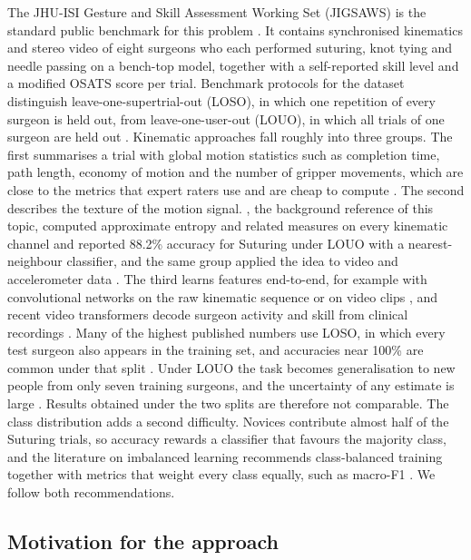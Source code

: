 The JHU-ISI Gesture and Skill Assessment Working Set (JIGSAWS) is the standard public benchmark for this problem \citep{gao2014jigsaws}. It contains synchronised kinematics and stereo video of eight surgeons who each performed suturing, knot tying and needle passing on a bench-top model, together with a self-reported skill level and a modified OSATS score per trial. Benchmark protocols for the dataset distinguish leave-one-supertrial-out (LOSO), in which one repetition of every surgeon is held out, from leave-one-user-out (LOUO), in which all trials of one surgeon are held out \citep{ahmidi2017benchmarks}. Kinematic approaches fall roughly into three groups. The first summarises a trial with global motion statistics such as completion time, path length, economy of motion and the number of gripper movements, which are close to the metrics that expert raters use and are cheap to compute \citep{reiley2011review, lefor2020motion, anh2020features}. The second describes the texture of the motion signal. \citet{zia2018rmis}, the background reference of this topic, computed approximate entropy \citep{pincus1991apen} and related measures on every kinematic channel and reported 88.2\% accuracy for Suturing under LOUO with a nearest-neighbour classifier, and the same group applied the idea to video and accelerometer data \citep{zia2018video}. The third learns features end-to-end, for example with convolutional networks on the raw kinematic sequence \citep{fawaz2018cnn, wang2018cnn} or on video clips \citep{funke2019video, liu2021unified}, and recent video transformers decode surgeon activity and skill from clinical recordings \citep{kiyasseh2023vit, lavanchy2021threestage}. Many of the highest published numbers use LOSO, in which every test surgeon also appears in the training set, and accuracies near 100\% are common under that split \citep{fawaz2018cnn, funke2019video}. Under LOUO the task becomes generalisation to new people from only seven training surgeons, and the uncertainty of any estimate is large \citep{varoquaux2018cv}. Results obtained under the two splits are therefore not comparable. The class distribution adds a second difficulty. Novices contribute almost half of the Suturing trials, so accuracy rewards a classifier that favours the majority class, and the literature on imbalanced learning recommends class-balanced training together with metrics that weight every class equally, such as macro-F1 \citep{he2009imbalanced}. We follow both recommendations.

\subsection{Motivation for the approach}

